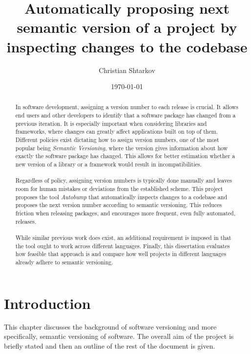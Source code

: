 \documentclass{l4proj}
\begin{document}
\title{Automatically proposing next semantic version of a project by \\
inspecting changes to the codebase}
\author{Christian Shtarkov}
\date{\today}
\maketitle

\begin{abstract}
In software development, assigning a version number
to each release is crucial. It allows end users and other developers
to identify that a software package has changed from a previous
iteration. It is especially important when considering libraries and
frameworks, where changes can greatly affect applications built on top
of them. \\ Different policies exist dictating how to assign version
numbers, one of the most popular being \textit{Semantic
Versioning}, where the version gives
information about how exactly the software package has changed. This
allows for better estimation whether a new version of a library or a
framework would result in incompatibilities.
\\\\
Regardless of
policy, assigning version numbers is typically done manually and
leaves room for human mistakes or deviations from the established
scheme. This project proposes the tool \textit{Autobump} that automatically
inspects changes to a codebase and proposes the next version number
according to semantic versioning. This reduces friction when releasing
packages, and encourages more frequent, even fully automated,
releases.
\\\\
While similar previous work does exist, an additional requirement is
imposed in that the tool ought to work across different languages.
Finally, this dissertation evaluates how feasible that approach is and
compare how well projects in different languages already adhere to
semantic versioning.
\end{abstract}

\educationalconsent

\tableofcontents

\chapter{Introduction}

This chapter discusses the background of software versioning and more
specifically, semantic versioning of software.
The overall aim of the project is briefly stated and then an outline
of the rest of the document is given.
\end{document}
